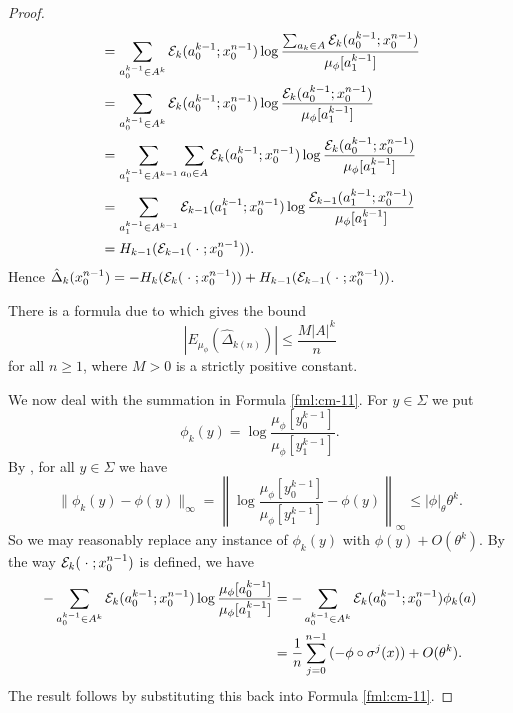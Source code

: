 \begin{lemma}
\begin{proof}
\begin{align*}
				&= \sum_{a_0^{k - 1} \in A^k}\mathcal{E}_k(a_0^{k - 1}; x_0^{n - 1}) \log{\frac{\sum_{a_{k} \in A}{\mathcal{E}_k(a_0^{k - 1}; x_0^{n - 1})}}{\mu_\phi[a_1^{k - 1}]}} \\
				&= \sum_{a_0^{k - 1} \in A^k}\mathcal{E}_k(a_0^{k - 1}; x_0^{n - 1}) \log{\frac{\mathcal{E}_k(a_0^{k - 1}; x_0^{n - 1})}{\mu_\phi[a_1^{k - 1}]}} \\
				&= \sum_{a_1^{k - 1} \in A^{k - 1}}\sum_{a_0 \in A}\mathcal{E}_k(a_0^{k - 1}; x_0^{n - 1}) \log{\frac{\mathcal{E}_k(a_0^{k - 1}; x_0^{n - 1})}{\mu_\phi[a_1^{k - 1}]}} \\
				&= \sum_{a_1^{k - 1} \in A^{k - 1}}\mathcal{E}_{k - 1}(a_1^{k - 1}; x_0^{n - 1}) \log{\frac{\mathcal{E}_{k - 1}(a_1^{k - 1}; x_0^{n - 1})}{\mu_\phi[a_1^{k - 1}]}} \\
				&= H_{k - 1}(\mathcal{E}_{k - 1}(\mathrel{}\cdot\mathrel{}; x_0^{n - 1})).
		\end{align*}
		Hence $\hat{\Delta}_k(x_0^{n - 1}) = -H_k(\mathcal{E}_k(\mathrel{}\cdot\mathrel{}; x_0^{n - 1})) + H_{k - 1}(\mathcal{E}_{k - 1}(\mathrel{}\cdot\mathrel{}; x_0^{n - 1}))$.
		
		There is a formula due to \cite[Formulae (4.15), (4.16)]{gabrielli-galves-guiol:fluctuations} which gives the bound
		\[
			|E_{\mu_\phi}(\hat{\Delta}_{k(n)})| \leq \frac{M|A|^k}{n}
		\]
		for all $n \geq 1$, where $M > 0$ is a strictly positive constant.
		
		We now deal with the summation in Formula \eqref{fml:cm-11}. For $y \in \Sigma$ we put
		\[
			\phi_k(y) = \log\frac{\mu_\phi[y_0^{k - 1}]}{\mu_\phi[y_1^{k - 1}]}.
		\]
		By , for all $y \in \Sigma$ we have
		\[
			\|\phi_k(y) - \phi(y)\|_\infty = \left\|\log\frac{\mu_\phi[y_0^{k - 1}]}{\mu_\phi[y_1^{k - 1}]} - \phi(y)\right\|_\infty \leq |\phi|_\theta \theta^k.
		\]
		So we may reasonably replace any instance of $\phi_k(y)$ with $\phi(y) + O(\theta^k)$. By the way $\mathcal{E}_k(\mathrel{}\cdot\mathrel{}; x_0^{n - 1})$ is defined, we have
		\begin{align*}
			-\sum_{a_0^{k - 1} \in A^k}\mathcal{E}_k(a_0^{k - 1}; x_0^{n - 1}) \log{\frac{\mu_\phi[a_0^{k - 1}]}{\mu_\phi[a_1^{k - 1}]}} &= -\sum_{a_0^{k - 1} \in A^k}\mathcal{E}_k(a_0^{k - 1}; x_0^{n - 1}) \phi_k(a) \\
				&= \frac{1}{n}\sum_{j = 0}^{n - 1}{(-\phi \circ \sigma^j(x))} + O(\theta^k).
		\end{align*}
		The result follows by substituting this back into Formula \eqref{fml:cm-11}.
	\end{proof}
\end{lemma}
